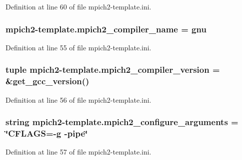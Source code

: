 Definition at line 60 of file mpich2-\/template.\-ini.

\hypertarget{namespacempich2-template_a65f102a602ca4727a803a9fd360d25a6}{
\subsubsection[{mpich2\-\_\-compiler\-\_\-name}]{\setlength{\rightskip}{0pt plus 5cm}mpich2-\/template.\-mpich2\-\_\-compiler\-\_\-name = gnu}}\label{namespacempich2-template_a65f102a602ca4727a803a9fd360d25a6}


Definition at line 55 of file mpich2-\/template.\-ini.

\hypertarget{namespacempich2-template_a74f41ead1e75cba3e87a1c2901517c19}{
\subsubsection[{mpich2\-\_\-compiler\-\_\-version}]{\setlength{\rightskip}{0pt plus 5cm}tuple mpich2-\/template.\-mpich2\-\_\-compiler\-\_\-version = \&get\-\_\-gcc\-\_\-version()}}\label{namespacempich2-template_a74f41ead1e75cba3e87a1c2901517c19}


Definition at line 56 of file mpich2-\/template.\-ini.

\hypertarget{namespacempich2-template_a4d2aaae7e07592dc3fce0b0d1b64e1ad}{
\subsubsection[{mpich2\-\_\-configure\-\_\-arguments}]{\setlength{\rightskip}{0pt plus 5cm}string mpich2-\/template.\-mpich2\-\_\-configure\-\_\-arguments = \char`\"{}C\-F\-L\-A\-G\-S=-\/g -\/pipe\char`\"{}}}\label{namespacempich2-template_a4d2aaae7e07592dc3fce0b0d1b64e1ad}


Definition at line 57 of file mpich2-\/template.\-ini.

